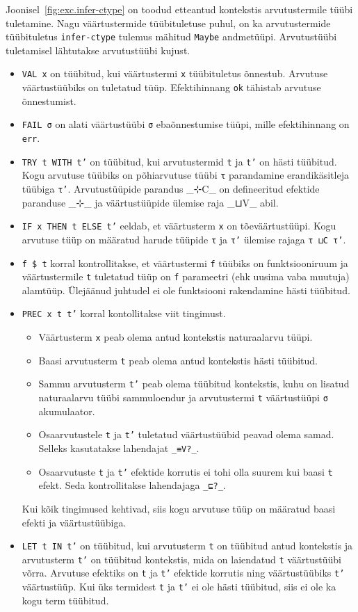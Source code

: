\documentclass[a4paper,12pt]{article}
\begin{document}
Joonisel~\ref{fig:exc.infer-ctype} on toodud etteantud kontekstis arvutustermile tüübi tuletamine.
Nagu väärtustermide tüübituletuse puhul, on ka arvutustermide tüübituletus {\tt infer-ctype} tulemus mähitud {\tt Maybe} andmetüüpi.
Arvutustüübi tuletamisel lähtutakse arvutustüübi kujust.
\begin{itemize}
\item {\tt VAL x} on tüübitud, kui väärtustermi {\tt x} tüübituletus õnnestub. Arvutuse väärtustüübiks on tuletatud tüüp. Efektihinnang {\tt ok} tähistab arvutuse õnnestumist. 
\item {\tt FAIL σ} on alati väärtustüübi {\tt σ} ebaõnnestumise tüüpi, mille efektihinnang on {\tt err}.
\item {\tt TRY t WITH t'} on tüübitud, kui arvutustermid {\tt t} ja {\tt t'} on hästi tüübitud. Kogu arvutuse tüübiks on põhiarvutuse tüübi {\tt τ} parandamine erandikäsitleja tüübiga {\tt τ'}. Arvutustüüpide parandus _⊹C_ on defineeritud efektide paranduse _⊹_ ja väärtustüüpide ülemise raja _⊔V_ abil.
\item {\tt IF x THEN t ELSE t'} eeldab, et väärtusterm {\tt x} on tõeväärtustüüpi. Kogu arvutuse tüüp on määratud harude tüüpide {\tt τ} ja {\tt τ'} ülemise rajaga {\tt τ ⊔C τ'}.
\item {\tt f \$ t} korral kontrollitakse, et väärtustermi {\tt f} tüübiks on funktsiooniruum ja väärtustermile {\tt t} tuletatud tüüp on {\tt f} parameetri (ehk uusima vaba muutuja) alamtüüp. Ülejäänud juhtudel ei ole funktsiooni rakendamine hästi tüübitud.
\item {\tt PREC x t t'} korral kontollitakse viit tingimust.
  \begin{itemize}
  \item Väärtusterm {\tt x} peab olema antud kontekstis naturaalarvu tüüpi.
  \item Baasi arvutusterm {\tt t} peab olema antud kontekstis hästi tüübitud.
  \item Sammu arvutusterm {\tt t'} peab olema tüübitud kontekstis, kuhu on lisatud naturaalarvu tüübi sammuloendur ja arvutustermi {\tt t} väärtustüüpi {\tt σ} akumulaator.
  \item Osaarvutustele {\tt t} ja {\tt t'} tuletatud väärtustüübid peavad olema samad. Selleks kasutatakse lahendajat {\tt _≡V?_}.
  \item Osaarvutuste {\tt t} ja {\tt t'} efektide korrutis ei tohi olla suurem kui baasi {\tt t} efekt. Seda kontrollitakse lahendajaga {\tt _⊑?_}.
  \end{itemize}
  Kui kõik tingimused kehtivad, siis kogu arvutuse tüüp on määratud baasi efekti ja väärtustüübiga.
\item {\tt LET t IN t'} on tüübitud, kui arvutusterm {\tt t} on tüübitud antud kontekstis ja arvutusterm {\tt t'} on tüübitud kontekstis, mida on laiendatud {\tt t} väärtustüübi võrra. Arvutuse efektiks on {\tt t} ja {\tt t'} efektide korrutis ning väärtustüübiks {\tt t'} väärtustüüp. Kui üks termidest {\tt t} ja {\tt t'} ei ole hästi tüübitud, siis ei ole ka kogu term tüübitud.
\end{itemize}
\end{document}
